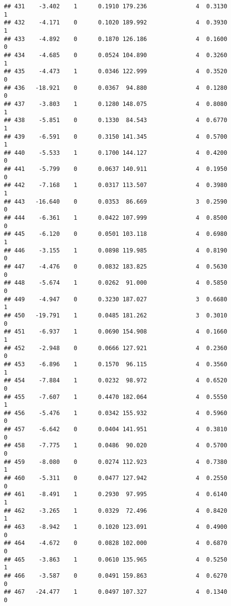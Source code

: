 \documentclass[
]{article}
\begin{document}
\begin{verbatim}
## 431    -3.402    1      0.1910 179.236              4  0.3130      1
## 432    -4.171    0      0.1020 189.992              4  0.3930      1
## 433    -4.892    0      0.1870 126.186              4  0.1600      0
## 434    -4.685    0      0.0524 104.890              4  0.3260      1
## 435    -4.473    1      0.0346 122.999              4  0.3520      0
## 436   -18.921    0      0.0367  94.880              4  0.1280      0
## 437    -3.803    1      0.1280 148.075              4  0.8080      1
## 438    -5.851    0      0.1330  84.543              4  0.6770      1
## 439    -6.591    0      0.3150 141.345              4  0.5700      1
## 440    -5.533    1      0.1700 144.127              4  0.4200      0
## 441    -5.799    0      0.0637 140.911              4  0.1950      0
## 442    -7.168    1      0.0317 113.507              4  0.3980      1
## 443   -16.640    0      0.0353  86.669              3  0.2590      0
## 444    -6.361    1      0.0422 107.999              4  0.8500      0
## 445    -6.120    0      0.0501 103.118              4  0.6980      1
## 446    -3.155    1      0.0898 119.985              4  0.8190      0
## 447    -4.476    0      0.0832 183.825              4  0.5630      0
## 448    -5.674    1      0.0262  91.000              4  0.5850      0
## 449    -4.947    0      0.3230 187.027              3  0.6680      1
## 450   -19.791    1      0.0485 181.262              3  0.3010      0
## 451    -6.937    1      0.0690 154.908              4  0.1660      1
## 452    -2.948    0      0.0666 127.921              4  0.2360      0
## 453    -6.896    1      0.1570  96.115              4  0.3560      1
## 454    -7.884    1      0.0232  98.972              4  0.6520      0
## 455    -7.607    1      0.4470 182.064              4  0.5550      1
## 456    -5.476    1      0.0342 155.932              4  0.5960      0
## 457    -6.642    0      0.0404 141.951              4  0.3810      0
## 458    -7.775    1      0.0486  90.020              4  0.5700      0
## 459    -8.080    0      0.0274 112.923              4  0.7380      1
## 460    -5.311    0      0.0477 127.942              4  0.2550      0
## 461    -8.491    1      0.2930  97.995              4  0.6140      1
## 462    -3.265    1      0.0329  72.496              4  0.8420      1
## 463    -8.942    1      0.1020 123.091              4  0.4900      0
## 464    -4.672    0      0.0828 102.000              4  0.6870      0
## 465    -3.863    1      0.0610 135.965              4  0.5250      1
## 466    -3.587    0      0.0491 159.863              4  0.6270      0
## 467   -24.477    1      0.0497 107.327              4  0.1340      0

\end{verbatim}
\end{document}

